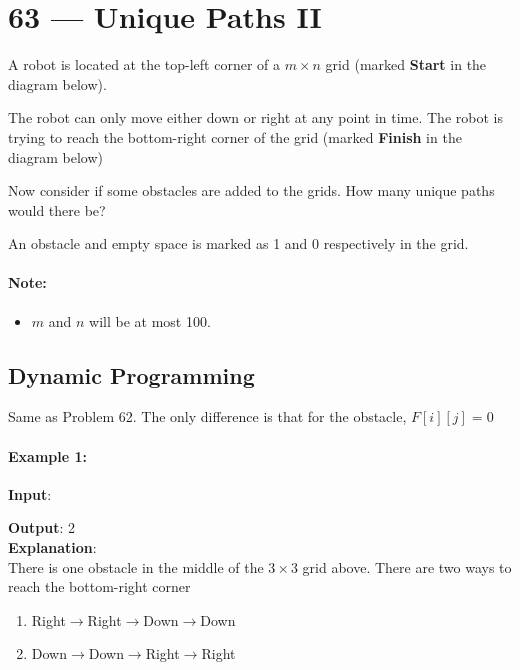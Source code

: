 \section{63 --- Unique Paths II}
A robot is located at the top-left corner of a $m \times n$ grid (marked \textbf{Start} in the diagram below).
\par
The robot can only move either down or right at any point in time. The robot is trying to reach the bottom-right corner of the grid (marked \textbf{Finish} in the diagram below)
\par
Now consider if some obstacles are added to the grids. How many unique paths would there be?
\par
An obstacle and empty space is marked as 1 and 0 respectively in the grid.

\paragraph{Note:}
\begin{itemize}
\item $m$ and $n$ will be at most 100.
\end{itemize}

\subsection{Dynamic Programming}
Same as Problem 62. The only difference is that for the obstacle, $F[i][j]=0$

\paragraph{Example 1:}
\begin{flushleft}
\textbf{Input}:
\begin{figure}[H]
\end{figure}
\textbf{Output}: 2
\\
\textbf{Explanation}:
\\
There is one obstacle in the middle of the $3\times 3$ grid above.
There are two ways to reach the bottom-right corner
\begin{enumerate}
\item Right$\to$Right$\to$Down$\to$Down
\item Down$\to$Down$\to$Right$\to$Right
\end{enumerate}
\end{flushleft}